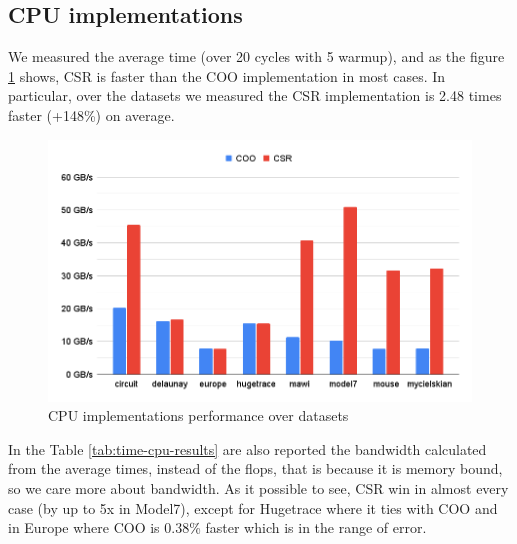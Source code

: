 \documentclass[conference]{IEEEtran}
\begin{document}
\subsection{CPU implementations}
We measured the average time (over 20 cycles with 5 warmup), and as the figure \ref{fig:time-cpu-results} shows, CSR is faster than the COO implementation in most cases. In particular, over the datasets we measured the CSR implementation is 2.48 times faster (+148\%) on average.

\begin{figure}[h!]
	\centering
	\includegraphics[width=1\linewidth]{data_images/cpu}
	\caption{CPU implementations performance over datasets}
	\label{fig:time-cpu-results}
\end{figure}

In the Table \ref{tab:time-cpu-results} are also reported the bandwidth calculated from the average times, instead of the flops, that is because it is memory bound, so we care more about bandwidth. As it possible to see, CSR win in almost every case (by up to 5x in Model7), except for Hugetrace where it ties with COO and in Europe where COO is 0.38\% faster which is in the range of error.
\end{document}
